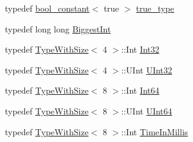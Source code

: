 \begin{DoxyCompactItemize}
\item 
typedef \hyperlink{structtesting_1_1internal_1_1bool__constant}{bool\+\_\+constant}$<$ true $>$ \hyperlink{namespacetesting_1_1internal_a62f917c3424d8841de9b49b5ec28edb4}{true\+\_\+type}
\item 
typedef long long \hyperlink{namespacetesting_1_1internal_a05c6bd9ede5ccdf25191a590d610dcc6}{Biggest\+Int}
\item 
typedef \hyperlink{classtesting_1_1internal_1_1TypeWithSize}{Type\+With\+Size}$<$ 4 $>$\+::Int \hyperlink{namespacetesting_1_1internal_a8ee38faaf875f133358abaf9bc056cec}{Int32}
\item 
typedef \hyperlink{classtesting_1_1internal_1_1TypeWithSize}{Type\+With\+Size}$<$ 4 $>$\+::U\+Int \hyperlink{namespacetesting_1_1internal_a40d4fffcd2bf56f18b1c380615aa85e3}{U\+Int32}
\item 
typedef \hyperlink{classtesting_1_1internal_1_1TypeWithSize}{Type\+With\+Size}$<$ 8 $>$\+::Int \hyperlink{namespacetesting_1_1internal_a271c563fec38b804ddab0677f51f70a8}{Int64}
\item 
typedef \hyperlink{classtesting_1_1internal_1_1TypeWithSize}{Type\+With\+Size}$<$ 8 $>$\+::U\+Int \hyperlink{namespacetesting_1_1internal_aa6a1ac454e6d7e550fa4925c62c35caa}{U\+Int64}
\item 
typedef \hyperlink{classtesting_1_1internal_1_1TypeWithSize}{Type\+With\+Size}$<$ 8 $>$\+::Int \hyperlink{namespacetesting_1_1internal_a66a845df404b38fe85c5e14a069f255a}{Time\+In\+Millis}
\end{DoxyCompactItemize}

